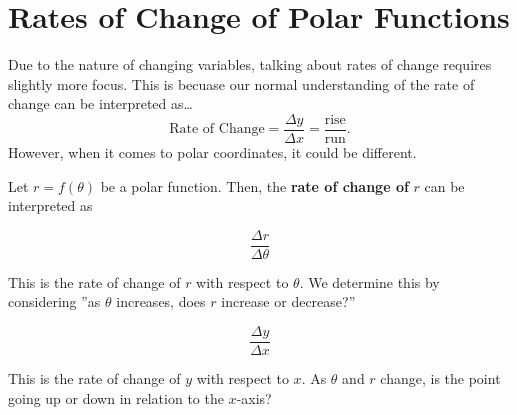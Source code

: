 \documentclass{exam}
\begin{document}
\section*{Rates of Change of Polar Functions}
Due to the nature of changing variables, talking about rates of change requires slightly more focus. This is becuase our normal understanding of the rate of change can be interpreted as\dots
\[\text{Rate of Change}=\frac{\Delta y}{\Delta x}=\frac{\text{rise}}{\text{run}}.\]
However, when it comes to polar coordinates, it could be different.

\begin{tcolorbox}[title=Defintion: \textit{Rates of Change in Polar Coordinates},title filled,colframe=black,sharpish corners,width=\linewidth]
    Let $r=f(\theta)$ be a polar function. Then, the \textbf{rate of change of} $r$ can be interpreted as 
    
    \begin{minipage}[t]{.45\linewidth}
        \[\displaystyle\frac{\Delta r}{\Delta \theta}\]

        This is the rate of change of $r$ with respect to $\theta$. We determine this by considering ''as $\theta$ increases, does $r$ increase or decrease?''
    \end{minipage}
    \hfil
    \begin{minipage}[t]{.45\linewidth}

        \[\displaystyle\frac{\Delta y}{\Delta x}\]

        This is the rate of change of $y$ with respect to $x$. As $\theta$ and $r$ change, is the point going up or down in relation to the $x$-axis?
        
    \end{minipage}


    \begin{center}
\end{center}
\end{tcolorbox}
\end{document}
